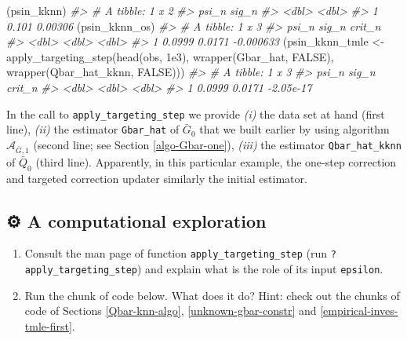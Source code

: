 \documentclass[
  11pt,
  openright,twoside]{book}
\newenvironment{Shaded}{\begin{snugshade}}{\end{snugshade}}
\newcommand{\CommentTok}[1]{\textcolor[rgb]{0.56,0.35,0.01}{\textit{#1}}}
\newcommand{\ConstantTok}[1]{\textcolor[rgb]{0.00,0.00,0.00}{#1}}
\newcommand{\FloatTok}[1]{\textcolor[rgb]{0.00,0.00,0.81}{#1}}
\newcommand{\FunctionTok}[1]{\textcolor[rgb]{0.00,0.00,0.00}{#1}}
\newcommand{\NormalTok}[1]{#1}
\newcommand{\OtherTok}[1]{\textcolor[rgb]{0.56,0.35,0.01}{#1}}
\newcommand{\gear}{\usebox{\gearbox}\;}
\newcommand{\Algo}{\widehat{\mathcal{A}}}
\newcommand{\Gbar}{\bar{G}}
\newcommand{\Qbar}{\bar{Q}}
\theoremstyle{definition}
\theoremstyle{definition}
\theoremstyle{definition}
\theoremstyle{definition}
\theoremstyle{remark}
\begin{document}
\begin{Shaded}
\begin{Highlighting}[]
\NormalTok{(psin\_kknn)}
\CommentTok{\#\textgreater{} \# A tibble: 1 x 2}
\CommentTok{\#\textgreater{}   psi\_n   sig\_n}
\CommentTok{\#\textgreater{}   \textless{}dbl\textgreater{}   \textless{}dbl\textgreater{}}
\CommentTok{\#\textgreater{} 1 0.101 0.00306}
\NormalTok{(psin\_kknn\_os)}
\CommentTok{\#\textgreater{} \# A tibble: 1 x 3}
\CommentTok{\#\textgreater{}    psi\_n  sig\_n    crit\_n}
\CommentTok{\#\textgreater{}    \textless{}dbl\textgreater{}  \textless{}dbl\textgreater{}     \textless{}dbl\textgreater{}}
\CommentTok{\#\textgreater{} 1 0.0999 0.0171 {-}0.000633}
\NormalTok{(psin\_kknn\_tmle }\OtherTok{\textless{}{-}} \FunctionTok{apply\_targeting\_step}\NormalTok{(}\FunctionTok{head}\NormalTok{(obs, }\FloatTok{1e3}\NormalTok{),}
                                        \FunctionTok{wrapper}\NormalTok{(Gbar\_hat, }\ConstantTok{FALSE}\NormalTok{),}
                                        \FunctionTok{wrapper}\NormalTok{(Qbar\_hat\_kknn, }\ConstantTok{FALSE}\NormalTok{)))}
\CommentTok{\#\textgreater{} \# A tibble: 1 x 3}
\CommentTok{\#\textgreater{}    psi\_n  sig\_n    crit\_n}
\CommentTok{\#\textgreater{}    \textless{}dbl\textgreater{}  \textless{}dbl\textgreater{}     \textless{}dbl\textgreater{}}
\CommentTok{\#\textgreater{} 1 0.0999 0.0171 {-}2.05e{-}17}
\end{Highlighting}
\end{Shaded}

In the call to \texttt{apply\_targeting\_step} we provide \emph{(i)} the data set at hand
(first line), \emph{(ii)} the estimator \texttt{Gbar\_hat} of \(\Gbar_{0}\) that we built
earlier by using algorithm \(\Algo_{\Gbar,1}\) (second line; see Section
\ref{algo-Gbar-one}), \emph{(iii)} the estimator \texttt{Qbar\_hat\_kknn} of \(\Qbar_{0}\)
(third line). Apparently, in this particular example, the one-step correction
and targeted correction updater similarly the initial estimator.

\hypertarget{exo-tmle}{%
\subsection{\texorpdfstring{⚙ \gear A computational exploration}{⚙ A computational exploration}}\label{exo-tmle}}

\begin{enumerate}
\def\labelenumi{\arabic{enumi}.}
\item
  Consult the man page of function \texttt{apply\_targeting\_step} (run
  \texttt{?apply\_targeting\_step}) and explain what is the role of its input
  \texttt{epsilon}.
\item
  Run the chunk of code below. What does it do? Hint: check out the chunks of
  code of Sections \ref{Qbar-knn-algo}, \ref{unknown-gbar-constr} and
  \ref{empirical-inves-tmle-first}.
\end{enumerate}
\end{document}
